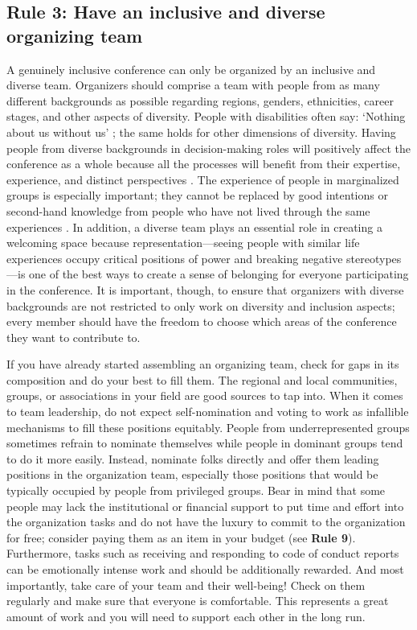 \documentclass[10pt,letterpaper]{article}
\begin{document}
\subsection*{Rule 3: Have an inclusive and diverse organizing team}
\label{rule_organizing_team}

A genuinely inclusive conference can only be organized by an inclusive and diverse team.
Organizers should comprise a team with people from as many different backgrounds as possible regarding regions, genders, ethnicities, career stages, and other aspects of diversity.
People with disabilities often say: `Nothing about us without us' \cite{charlton_nothing_1998, werner_nothing_1998}; the same holds for other dimensions of diversity. 
Having people from diverse backgrounds in decision-making roles will positively affect the conference as a whole because all the processes will benefit from their expertise, experience, and distinct perspectives \cite{hongGroupsDiverseProblem2004}. 
The experience of people in marginalized groups
is especially important; they cannot be replaced by good intentions or second-hand knowledge from people who have not lived through the same experiences \cite{costanzachockDesign2020}.
In addition, a diverse team plays an essential role in creating a welcoming space because representation—seeing people with similar life experiences occupy critical positions of power and breaking negative stereotypes—is one of the best ways to create a sense of belonging for everyone participating in the conference.
It is important, though, to ensure that organizers with diverse backgrounds are not restricted to only work on diversity and inclusion aspects; 
every member should have the freedom to choose which areas of the conference they want to contribute to.

If you have already started assembling an organizing team, check for gaps in its composition and do your best to fill them. 
The regional and local communities, groups, or associations in your field are good sources to tap into. 
When it comes to team leadership, do not expect self-nomination and voting to work as infallible mechanisms to fill these positions equitably. 
People from underrepresented groups sometimes refrain to nominate themselves while people in dominant groups tend to do it more easily. 
Instead, nominate folks directly and offer them leading positions in the organization team, especially those positions that would be typically occupied by people from privileged groups.
Bear in mind that some people may lack the institutional or financial support to put time and effort into the organization tasks and do not have the luxury to commit to the organization for free; consider paying them as an item in your budget (see \textbf{Rule 9}).
Furthermore, tasks such as receiving and responding to code of conduct reports can be emotionally intense work and should be additionally rewarded.
And most importantly, take care of your team and their well-being! Check on them regularly and make sure that everyone is comfortable. This represents a great amount of work and you will need to support each other in the long run.
\end{document}
